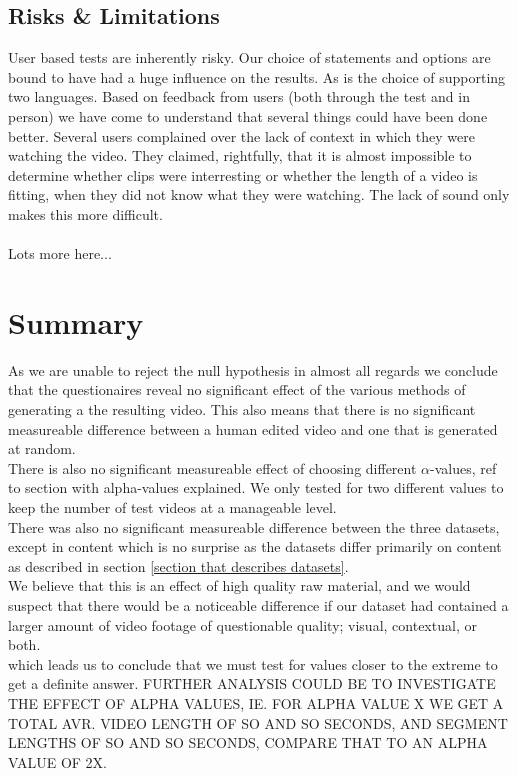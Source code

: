 \subsection{Risks \& Limitations}
%
User based tests are inherently risky. Our choice of statements and options are bound to have had a huge influence on the results. As is the choice of supporting two languages. Based on feedback from users (both through the test and in person) we have come to understand that several things could have been done better. Several users complained over the lack of context in which they were watching the video. They claimed, rightfully, that it is almost impossible to determine whether clips were interresting or whether the length of a video is fitting, when they did not know what they were watching. The lack of sound only makes this more difficult.\\\\
%
Lots more here...
%
\section{Summary}
%

%
As we are unable to reject the null hypothesis in almost all regards we conclude that the questionaires reveal no significant effect of the various methods of generating a the resulting video. This also means that there is no significant measureable difference between a human edited video and one that is generated at random.\\
There is also no significant measureable effect of choosing different $\alpha$-values, ref to section with alpha-values explained. We only tested for two different values to keep the number of test videos at a manageable level.\\
There was also no significant measureable difference between the three datasets, except in content which is no surprise as the datasets differ primarily on content as described in section \ref{section that describes datasets}.\\
%
We believe that this is an effect of high quality raw material, and we would suspect that there would be a noticeable difference if our dataset had contained a larger amount of video footage of questionable quality; visual, contextual, or both.\\
which leads us to conclude that we must test for values closer to the extreme to get a definite answer. FURTHER ANALYSIS COULD BE TO INVESTIGATE THE EFFECT OF ALPHA VALUES, IE. FOR ALPHA VALUE X WE GET A TOTAL AVR. VIDEO LENGTH OF SO AND SO SECONDS, AND SEGMENT LENGTHS OF SO AND SO SECONDS, COMPARE THAT TO AN ALPHA VALUE OF 2X.\\
%